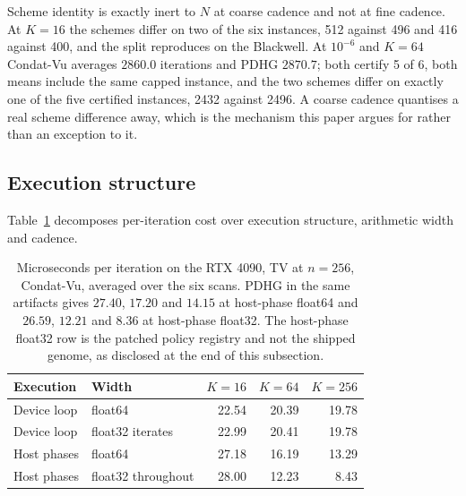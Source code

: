 Scheme identity is exactly inert to $N$ at coarse cadence and not at fine
cadence. At $K=16$ the schemes differ on two of the six instances, 512 against
496 and 416 against 400, and the split reproduces on the Blackwell. At
$10^{-6}$ and $K=64$ Condat-Vu averages $2860.0$ iterations and PDHG $2870.7$;
both certify 5 of 6, both means include the same capped instance, and the two
schemes differ on exactly one of the five certified instances, 2432 against
2496. A coarse cadence quantises a real scheme difference away, which is the
mechanism this paper argues for rather than an exception to it.

\subsection{Execution structure}
\label{sec:exp:execution}

Table~\ref{tab:periter} decomposes per-iteration cost over execution structure,
arithmetic width and cadence.

\begin{table}[t]
\centering
\caption{Microseconds per iteration on the RTX 4090, TV at $n=256$, Condat-Vu,
averaged over the six scans. PDHG in the same artifacts gives $27.40$, $17.20$
and $14.15$ at host-phase float64 and $26.59$, $12.21$ and $8.36$ at host-phase
float32. The host-phase float32 row is the patched policy registry and not the
shipped genome, as disclosed at the end of this subsection.}
\label{tab:periter}
\begin{tabular}{@{}llrrr@{}}
\toprule
Execution & Width & $K=16$ & $K=64$ & $K=256$ \\
\midrule
Device loop  & float64                & 22.54 & 20.39 & 19.78 \\
Device loop  & float32 iterates       & 22.99 & 20.41 & 19.78 \\
Host phases  & float64                & 27.18 & 16.19 & 13.29 \\
Host phases  & float32 throughout     & 28.00 & 12.23 &  8.43 \\
\bottomrule
\end{tabular}
\end{table}

